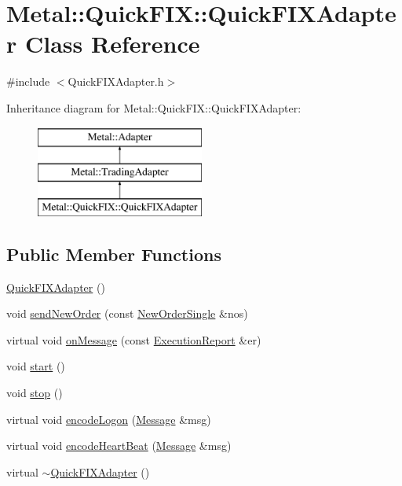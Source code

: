 \hypertarget{classMetal_1_1QuickFIX_1_1QuickFIXAdapter}{}\section{Metal\+:\+:Quick\+F\+I\+X\+:\+:Quick\+F\+I\+X\+Adapter Class Reference}
\label{classMetal_1_1QuickFIX_1_1QuickFIXAdapter}


{\ttfamily \#include $<$Quick\+F\+I\+X\+Adapter.\+h$>$}

Inheritance diagram for Metal\+:\+:Quick\+F\+I\+X\+:\+:Quick\+F\+I\+X\+Adapter\+:\begin{figure}[H]
\begin{center}
\leavevmode
\includegraphics[height=3.000000cm]{classMetal_1_1QuickFIX_1_1QuickFIXAdapter}
\end{center}
\end{figure}
\subsection*{Public Member Functions}
\begin{DoxyCompactItemize}
\item 
\hyperlink{classMetal_1_1QuickFIX_1_1QuickFIXAdapter_ac437c5ed10c4b0ed06a49b31d194be70}{Quick\+F\+I\+X\+Adapter} ()
\item 
void \hyperlink{classMetal_1_1QuickFIX_1_1QuickFIXAdapter_ae53ab5057d4e2003a486ddc5761935a1}{send\+New\+Order} (const \hyperlink{classMetal_1_1NewOrderSingle}{New\+Order\+Single} \&nos)
\item 
virtual void \hyperlink{classMetal_1_1QuickFIX_1_1QuickFIXAdapter_acf1ae68d29b8a22c7252891665d218a8}{on\+Message} (const \hyperlink{namespaceMetal_af4294c176f6aecf9f75e9b106b117aa1}{Execution\+Report} \&er)
\item 
void \hyperlink{classMetal_1_1QuickFIX_1_1QuickFIXAdapter_a20f5db6305b3f479e12553f021765d60}{start} ()
\item 
void \hyperlink{classMetal_1_1QuickFIX_1_1QuickFIXAdapter_af0e438d5d64fa8a0aa3024b5a995f885}{stop} ()
\item 
virtual void \hyperlink{classMetal_1_1QuickFIX_1_1QuickFIXAdapter_ade65590a3da99272d88059e8f031b4d4}{encode\+Logon} (\hyperlink{classMetal_1_1Message}{Message} \&msg)
\item 
virtual void \hyperlink{classMetal_1_1QuickFIX_1_1QuickFIXAdapter_afa4aac6757cb58c2723eda4043156a4a}{encode\+Heart\+Beat} (\hyperlink{classMetal_1_1Message}{Message} \&msg)
\item 
virtual \hyperlink{classMetal_1_1QuickFIX_1_1QuickFIXAdapter_a3023c5d511ae87ee7a1cf73897fd09aa}{$\sim$\+Quick\+F\+I\+X\+Adapter} ()
\end{DoxyCompactItemize}
